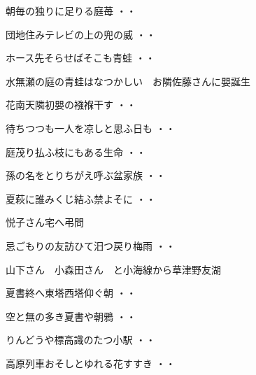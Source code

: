 \begin{shiika}朝毎の独りに足りる庭苺
\hfill{・・}\end{shiika}
\begin{shiika}団地住みテレビの上の兜の威
\hfill{・・}\end{shiika}
\begin{shiika}ホース先そらせばそこも青蛙
\hfill{・・}\end{shiika}
\vspace{0.6cm}
水無瀬の庭の青蛙はなつかしい　お隣佐藤さんに嬰誕生
\begin{shiika}花南天隣初嬰の襁褓干す
\hfill{・・}\end{shiika}
\begin{shiika}待ちつつも一人を凉しと思ふ日も
\hfill{・・}\end{shiika}
\begin{shiika}庭茂り払ふ枝にもある生命
\hfill{・・}\end{shiika}
\begin{shiika}孫の名をとりちがえ呼ぶ盆家族
\hfill{・・}\end{shiika}
\begin{shiika}夏萩に誰みくじ結ふ禁よそに
\hfill{・・}\end{shiika}
\vspace{0.6cm}
悦子さん宅へ弔問
\begin{shiika}忌ごもりの友訪ひて汨つ戻り梅雨
\hfill{・・}\end{shiika}
\vspace{0.6cm}
山下さん　小森田さん　と小海線から草津野友湖
\begin{shiika}夏書終へ東塔西塔仰ぐ朝
\hfill{・・}\end{shiika}
\begin{shiika}空と無の多き夏書や朝鴉
\hfill{・・}\end{shiika}
\begin{shiika}りんどうや標高識のたつ小駅
\hfill{・・}\end{shiika}
\begin{shiika}高原列車おそしとゆれる花すすき
\hfill{・・}\end{shiika}

